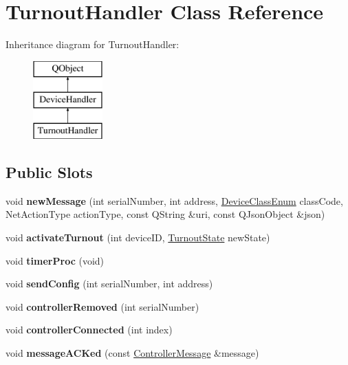 \hypertarget{class_turnout_handler}{}\section{Turnout\+Handler Class Reference}
\label{class_turnout_handler}
Inheritance diagram for Turnout\+Handler\+:\begin{figure}[H]
\begin{center}
\leavevmode
\includegraphics[height=3.000000cm]{class_turnout_handler}
\end{center}
\end{figure}
\subsection*{Public Slots}
\begin{DoxyCompactItemize}
\item 
\mbox{\label{class_turnout_handler_aa6d1a7bce510b3d3bc092c83157ea9d7}} 
void {\bfseries new\+Message} (int serial\+Number, int address, \hyperlink{_global_defs_8h_ad17679fac69973be9b3a2787a60d7722}{Device\+Class\+Enum} class\+Code, Net\+Action\+Type action\+Type, const Q\+String \&uri, const Q\+Json\+Object \&json)
\item 
\mbox{\label{class_turnout_handler_af98a879c6e94f86901597f2204aafac2}} 
void {\bfseries activate\+Turnout} (int device\+ID, \hyperlink{_global_defs_8h_aaf453b54a68a7675a75e9149251d2570}{Turnout\+State} new\+State)
\item 
\mbox{\label{class_turnout_handler_ad250479f8c68d9195bbd6ae09bce2981}} 
void {\bfseries timer\+Proc} (void)
\item 
\mbox{\label{class_turnout_handler_ae2954780d7cf786caa6915102ca90fac}} 
void {\bfseries send\+Config} (int serial\+Number, int address)
\item 
\mbox{\label{class_turnout_handler_adfc83db04edca044530eb60d218df955}} 
void {\bfseries controller\+Removed} (int serial\+Number)
\item 
\mbox{\label{class_turnout_handler_af43378afbad7e068ad7e78dc4f1171bf}} 
void {\bfseries controller\+Connected} (int index)
\item 
\mbox{\label{class_turnout_handler_adef14f53ff303fdb9ca4599a1a7479b9}} 
void {\bfseries message\+A\+C\+Ked} (const \hyperlink{class_controller_message}{Controller\+Message} \&message)
\end{DoxyCompactItemize}
